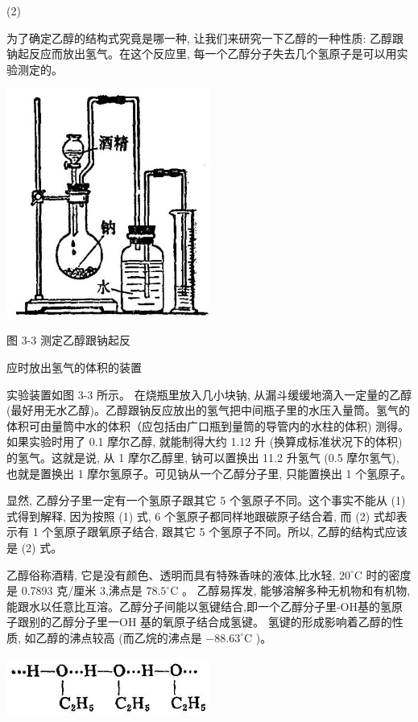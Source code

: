 \documentclass[10pt]{article}
\begin{document}
(2)

为了确定乙醇的结构式究竟是哪一种, 让我们来研究一下乙醇的一种性质: 乙醇跟钠起反应而放出氢气。在这个反应里, 每一个乙醇分子失去几个氢原子是可以用实验测定的。

\begin{center}
\includegraphics[max width=0.5\textwidth]{images/01912d16-be99-77bb-9535-4f3ed8d9946f_113_104108.jpg}
\end{center}

图 3-3 测定乙醇跟钠起反

应时放出氢气的体积的装置

实验装置如图 3-3 所示。 在烧瓶里放入几小块钠, 从漏斗缓缓地滴入一定量的乙醇 (最好用无水乙醇)。乙醇跟钠反应放出的氢气把中间瓶子里的水压入量筒。氢气的体积可由量筒中水的体积（应包括由广口瓶到量筒的导管内的水柱的体积) 测得。如果实验时用了 0.1 摩尔乙醇, 就能制得大约 1.12 升 (换算成标准状况下的体积) 的氢气。这就是说, 从 1 摩尔乙醇里, 钠可以置换出 11.2 升氢气 (0.5 摩尔氢气), 也就是置换出 1 摩尔氢原子。可见钠从一个乙醇分子里, 只能置换出 1 个氢原子。

显然, 乙醇分子里一定有一个氢原子跟其它 5 个氢原子不同。这个事实不能从 (1) 式得到解释, 因为按照 (1) 式, 6 个氢原子都同样地跟碳原子结合着, 而 (2) 式却表示有 1 个氢原子跟氧原子结合, 跟其它 5 个氢原子不同。所以, 乙醇的结构式应该是 (2) 式。

乙醇俗称酒精, 它是没有颜色、透明而具有特殊香味的液体,比水轻, \({20}^{ \circ }\mathrm{C}\) 时的密度是 0.7893 克/厘米 3,沸点是 \({78.5}^{ \circ }\mathrm{C}\) 。 乙醇易挥发, 能够溶解多种无机物和有机物, 能跟水以任意比互溶。乙醇分子间能以氢键结合,即一个乙醇分子里-OH基的氢原子跟别的乙醇分子里一OH 基的氧原子结合成氢键。 氢键的形成影响着乙醇的性质, 如乙醇的沸点较高 (而乙烷的沸点是 \(- {88.63}^{ \circ }\mathrm{C}\) )。

\begin{center}
\includegraphics[max width=0.5\textwidth]{images/01912d16-be99-77bb-9535-4f3ed8d9946f_114_112468.jpg}
\end{center}
\end{document}
